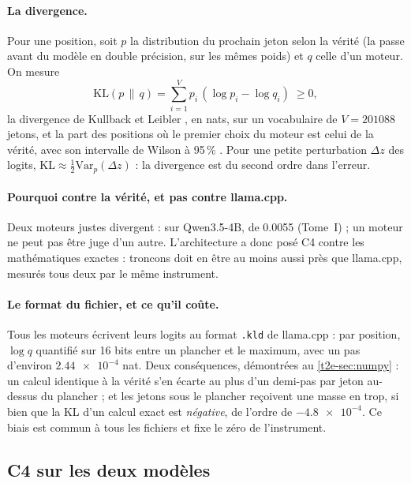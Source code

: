 \paragraph{La divergence.} Pour une position, soit $p$ la distribution du prochain jeton selon la vérité (la passe avant du modèle en double précision, sur les mêmes poids) et $q$ celle d'un moteur. On mesure
\[
\mathrm{KL}(p \,\|\, q) = \sum_{i=1}^{V} p_i \,(\log p_i - \log q_i) \;\ge 0,
\]
la divergence de Kullback et Leibler \cite{kullback1951}, en nats, sur un vocabulaire de $V = \num{201088}$ jetons, et la part des positions où le premier choix du moteur est celui de la vérité, avec son intervalle de Wilson à 95\,\% \cite{wilson1927}. Pour une petite perturbation $\Delta z$ des logits, $\mathrm{KL} \approx \tfrac12 \mathrm{Var}_p(\Delta z)$ : la divergence est du second ordre dans l'erreur.

\paragraph{Pourquoi contre la vérité, et pas contre llama.cpp.} Deux moteurs justes divergent : sur Qwen3.5-4B, de \num{0.0055} (Tome~I) ; un moteur ne peut pas être juge d'un autre. L'architecture a donc posé C4 contre les mathématiques exactes : troncons doit en être au moins aussi près que llama.cpp, mesurés tous deux par le même instrument.

\paragraph{Le format du fichier, et ce qu'il coûte.} Tous les moteurs écrivent leurs logits au format \texttt{.kld} de llama.cpp : par position, $\log q$ quantifié sur 16 bits entre un plancher et le maximum, avec un pas d'environ $\num{2.44e-4}$ nat. Deux conséquences, démontrées au \cref{t2e-sec:numpy} : un calcul identique à la vérité s'en écarte au plus d'un demi-pas par jeton au-dessus du plancher ; et les jetons sous le plancher reçoivent une masse en trop, si bien que la KL d'un calcul exact est \emph{négative}, de l'ordre de $-\num{4.8e-4}$. Ce biais est commun à tous les fichiers et fixe le zéro de l'instrument.

\subsection{C4 sur les deux modèles}

